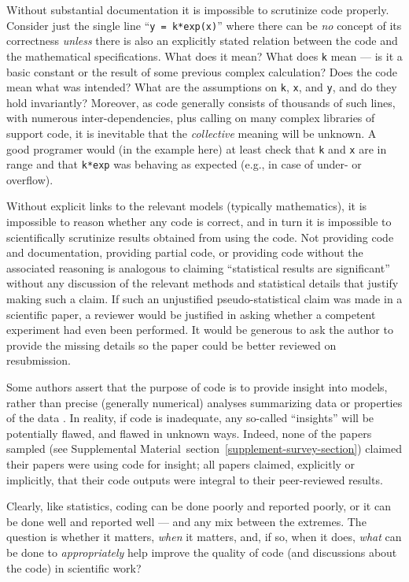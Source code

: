 \documentclass{comjnl}
\def\supplement{Supplemental Material}
\begin{document}
Without substantial documentation it is impossible to scrutinize code properly. Consider just the single line ``\texttt{y = k*exp(x)}'' where there can be \emph{no\/} concept of its correctness \emph{unless\/} there is also an explicitly stated relation between the code and the mathematical specifications. What does it mean? What does \texttt{k} mean --- is it a basic constant or the result of some previous complex calculation? Does the code mean what was intended? What are the assumptions on \texttt{k}, \texttt{x}, and \texttt{y}, and do they hold invariantly? Moreover, as code generally consists of thousands of such lines, with numerous inter-dependencies, plus calling on many complex libraries of support code, it is inevitable that the \emph{collective\/} meaning will be unknown. A good programer would (in the example here) at least check that \texttt{k} and \texttt{x} are in range and that \texttt{k*exp} was behaving as expected (e.g., in case of under- or overflow).

Without explicit links to the relevant models (typically mathematics), it is impossible to reason whether any code is correct, and in turn it is impossible to scientifically scrutinize results obtained from using the code. Not providing code and documentation, providing partial code, or providing code without the associated reasoning is analogous to claiming ``statistical results are significant'' without any discussion of the relevant methods and statistical details that justify making such a claim. If such an unjustified pseudo-statistical claim was made in a scientific paper, a reviewer would be justified in asking whether a competent experiment had even been performed. It would be generous to ask the author to provide the missing details so the paper could be better reviewed on resubmission. 

Some authors assert that the purpose of code is to provide insight into models, rather than precise (generally numerical) analyses summarizing data or properties of the data \cite{assessing-quality}. In reality, if code is inadequate, any so-called ``insights'' will be potentially flawed, and flawed in unknown ways. Indeed, none of the papers sampled (see \supplement\ section~\ref{supplement-survey-section}) claimed their papers were using code for insight; all papers claimed, explicitly or implicitly, that their code outputs were integral to their peer-reviewed results.

Clearly, like statistics, coding can be done poorly and reported poorly, or it can be done well and reported well --- and any mix between the extremes. The question is whether it matters, \emph{when\/} it matters, and, if so, when it does, \emph{what\/} can be done to \emph{appropriately\/} help improve the quality of code (and discussions about the code) in scientific work?
\end{document}
